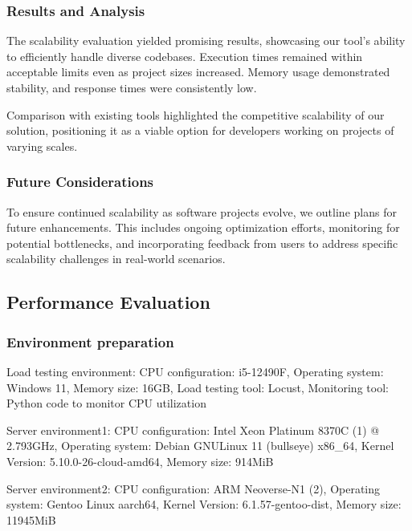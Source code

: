 \documentclass[journal]{IEEEtran}
\begin{document}
\subsubsection{Results and Analysis}

The scalability evaluation yielded promising results, showcasing our tool's ability to efficiently handle diverse codebases. Execution times remained within acceptable limits even as project sizes increased. Memory usage demonstrated stability, and response times were consistently low.

Comparison with existing tools highlighted the competitive scalability of our solution, positioning it as a viable option for developers working on projects of varying scales.

\subsubsection{Future Considerations}

To ensure continued scalability as software projects evolve, we outline plans for future enhancements. This includes ongoing optimization efforts, monitoring for potential bottlenecks, and incorporating feedback from users to address specific scalability challenges in real-world scenarios.

\subsection{Performance Evaluation}

\subsubsection{Environment preparation}
Load testing environment:
CPU configuration: i5-12490F,
Operating system: Windows 11,
Memory size: 16GB,
Load testing tool: Locust,
Monitoring tool: Python code to monitor CPU utilization

Server environment1:
CPU configuration: Intel Xeon Platinum 8370C (1) @ 2.793GHz,
Operating system: Debian GNU\/Linux 11 (bullseye) x86\_64,
Kernel Version: 5.10.0-26-cloud-amd64,
Memory size: 914MiB

Server environment2:
CPU configuration: ARM Neoverse-N1 (2),
Operating system: Gentoo Linux aarch64,
Kernel Version: 6.1.57-gentoo-dist,
Memory size: 11945MiB
\end{document}
